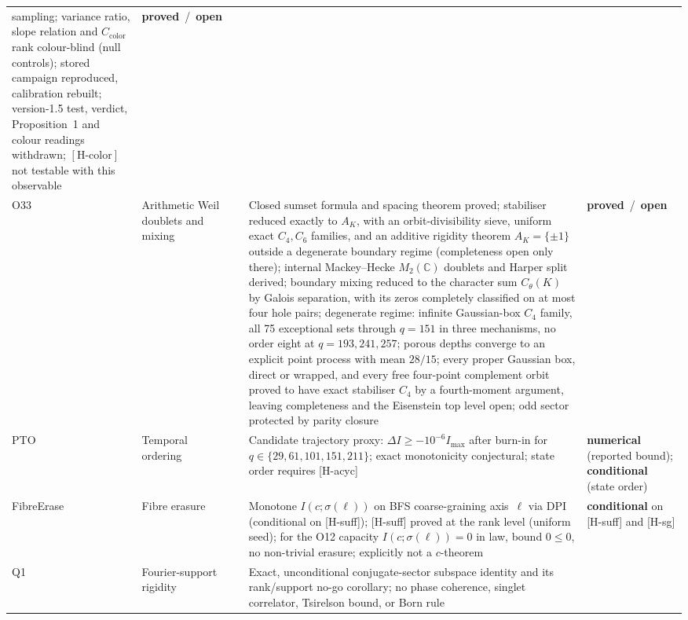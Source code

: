 \documentclass[11pt,a4paper]{article}
\newcommand{\sproved}{\textcolor{cproved}{\textbf{proved}}}
\newcommand{\sopen}{\textcolor{copen}{\textbf{open}}}
\newcommand{\snum}{\textcolor{cnum}{\textbf{numerical}}}
\newcommand{\scond}{\textcolor{ccond}{\textbf{conditional}}}
\begin{document}
\begin{longtable}{@{}p{1.70cm}p{2.9cm}p{1.3cm}p{6.25cm}>{\raggedright\arraybackslash}p{2.0cm}@{}}
      sampling; variance ratio, slope relation and $C_{\mathrm{color}}$ rank colour-blind (null controls);
      stored campaign reproduced, calibration rebuilt; version-1.5 test, verdict, Proposition~1 and colour
      readings withdrawn; $[\mathrm{H\text{-}color}]$ not testable with this observable &
      \sproved\ /\ \sopen \\[3pt]
      O33 & Arithmetic Weil doublets and mixing & \cite{Beau2026a37} &
      Closed sumset formula and spacing theorem proved;
      stabiliser reduced exactly to $A_K$, with an orbit-divisibility sieve, uniform
      exact $C_4,C_6$ families, and an additive rigidity theorem $A_K=\{\pm1\}$ outside a
      degenerate boundary regime (completeness open only there);
      internal Mackey--Hecke $M_2(\mathbb{C})$ doublets and Harper split derived;
      boundary mixing reduced to the character sum $C_\theta(K)$ by Galois separation, with
      its zeros completely classified on at most four hole pairs;
      degenerate regime: infinite Gaussian-box $C_4$ family, all 75
      exceptional sets through $q=151$ in three mechanisms, no order eight at $q=193,241,257$;
      porous depths converge to an explicit point process with mean $28/15$;
      every proper Gaussian box, direct or wrapped, and every free four-point complement
      orbit proved to have exact stabiliser $C_4$ by a fourth-moment argument, leaving
      completeness and the Eisenstein top level open;
      odd sector protected by parity closure &
      \sproved\ /\ \sopen \\[3pt]
      PTO & Temporal ordering & \cite{Beau2026pto} &
      Candidate trajectory proxy: $\Delta I \geq -10^{-6}I_{\max}$ after burn-in for
      $q \in \{29, 61, 101, 151, 211\}$; exact monotonicity conjectural;
      state order requires [H-acyc] &
      \snum{} (reported bound); \scond{} (state order) \\[3pt]
      Fibre\-Erase & Fibre erasure & \cite{Beau2026fe} &
      Monotone $I(c;\sigma(\ell))$ on BFS coarse-graining axis~$\ell$ via DPI (conditional on
      [H-suff]); [H-suff] proved at the rank level (uniform seed); for the O12 capacity
      $I(c;\sigma(\ell)) = 0$ in law, bound $0\leq0$, no non-trivial erasure; explicitly not a
      $c$-theorem &
      \scond{} on [H-suff] and [H-sg] \\[3pt]
      \midrule
      Q1 & Fourier-support rigidity & \cite{Beau2026q1} &
      Exact, unconditional conjugate-sector subspace identity and its rank/support no-go
      corollary; no phase coherence, singlet correlator, Tsirelson bound, or Born rule &

\end{longtable}
\end{document}
